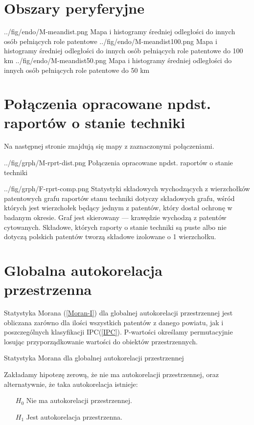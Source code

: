     \newpage\section
  {Obszary peryferyjne}

  \newpage\charttripled
{../fig/endo/M-meandist.png}
{ Mapa i histogramy średniej odległości do innych osób pełniących role patentowe }
{../fig/endo/M-meandist100.png}
{ Mapa i histogramy średniej odległości do innych osób pełniących role patentowe do 100 km }
{../fig/endo/M-meandist50.png}
{ Mapa i histogramy średniej odległości do innych osób pełniących role patentowe do 50 km }




    \newpage\section
  {Połączenia opracowane npdst. raportów o stanie techniki}

Na następnej stronie znajdują się mapy z zaznaczonymi połączeniami.

\newpage

  \chart
{../fig/grph/M-rprt-dist.png}
{ Połączenia opracowane npdst. raportów o stanie techniki }\newpage

  \chartside
{../fig/grph/F-rprt-comp.png}
{ Statystyki składowych wychodzących z wierzchołków patentowych
  grafu raportów stanu techniki }{
 dotyczy składowych grafu, wśród których
jest wierzchołek będący jednym z patentów, który dostał ochronę w badanym okresie.
Graf jest skierowany --- krawędzie wychodzą z patentów cytowanych.
Składowe, których raporty o stanie techniki są puste albo nie dotyczą 
polskich patentów tworzą składowe izolowane o 1 wierzchołku.
}



    \newpage\section
  {Globalna autokorelacja przestrzenna}

Statystyka Morana (\cref{Moran-I}) dla globalnej autokorelacji przestrzennej
jest obliczana zarówno dla ilości wszystkich patentów z danego powiatu, 
jak i poszczególnych klasyfikacji \ac{IPC}(\cref{IPC}).
P-wartości określamy permutacyjnie losując przyporządkowanie wartości
do obiektów przestrzennych\cite{pysal-07}.

{ Statystyka Morana dla globalnej 
  autokorelacji przestrzennej }
{
  Zakładamy hipotezę zerową, że nie ma autokorelacji przestrzennej, oraz
alternatywnie, że taka autokorelacja istnieje:
\begin{itemize}
\item[$H_0$] Nie ma autokorelacji przestrzennej.
\item[$H_1$] Jest autokorelacja przestrzenna.
\end{itemize}}

